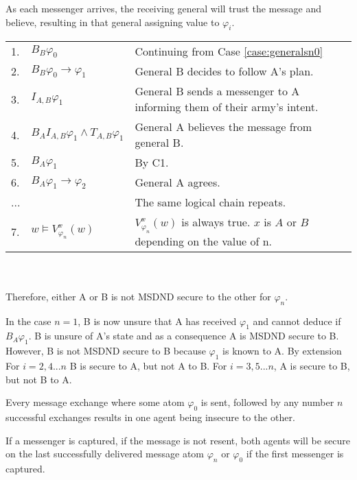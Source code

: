 As each messenger arrives, the receiving general will trust the message and believe, resulting in that general assigning value to $\varphi_i$.

\begin{table}[h!]
\centering
\small
\begin{tabularx}{\linewidth}{l l X}
1. & $B_{B} \varphi_0$ & Continuing from Case \ref{case:generalsn0} \\
2. & $B_{B} \varphi_0 \rightarrow \varphi_1$ & General B decides to follow A's plan. \\
3. & $I_{A,B} \varphi_1$ & General B sends a messenger to A informing them of their army's intent. \\
4. & $B_{A}I_{A,B} \varphi_1 \wedge T_{A,B} \varphi_1$ & General A believes the message from general B. \\
5. & $B_{A}\varphi_1$ & By C1. \\
6. & $B_{A}\varphi_1 \rightarrow \varphi_2$ & General A agrees. \\
...& & The same logical chain repeats. \\
7. & $w \vDash V_{\varphi_n}^{x}(w)$ & $V_{\varphi_n}^{x}(w)$ is always true. $x$ is $A$ or $B$ depending on the value of n. %
\end{tabularx} \\~\\
Therefore, either A or B is not MSDND secure to the other for $\varphi_n$.
\label{tab:twoarmiesproof}
\end{table}

In the case $n=1$, B is now unsure that A has received $\varphi_1$ and cannot deduce if $B_{A} \varphi_1$. B is unsure of A's state and as a consequence A is MSDND secure to B. However, B is not MSDND secure to B because $\varphi_1$ is known to A. By extension For $i=2,4...n$ B is secure to A, but not A to B. For $i=3,5...n$, A is secure to B, but not B to A.

\begin{cor}
Every message exchange where some atom $\varphi_0$ is sent, followed by any number $n$ successful exchanges results in one agent being insecure to the other.
\end{cor}

\begin{thm}
If a messenger is captured, if the message is not resent, both agents will be secure on the last successfully delivered message atom $\varphi_{n}$ or $\varphi_0$ if the first messenger is captured.
\end{thm}


